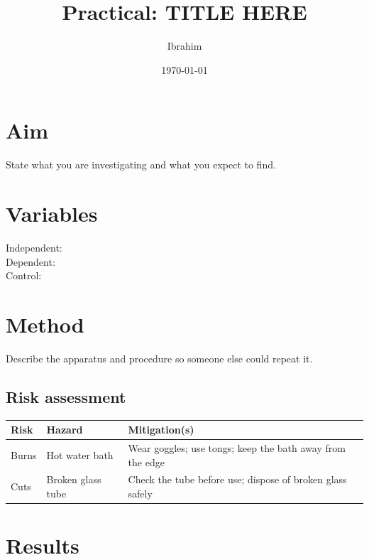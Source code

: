 \documentclass[11pt,a4paper]{article}
\title{Practical: TITLE HERE}
\author{Ibrahim}
\date{\today}
\begin{document}
\maketitle

\section{Aim}
State what you are investigating and what you expect to find.

\section{Variables}
\begin{description}
  \item[Independent:] 
  \item[Dependent:] 
  \item[Control:] 
\end{description}

\section{Method}
Describe the apparatus and procedure so someone else could repeat it.

\subsection{Risk assessment}
\begin{table}[H]\centering
\begin{tabularx}{\textwidth}{@{}l X X@{}}
\toprule
Risk & Hazard & Mitigation(s) \\
\midrule
Burns & Hot water bath & Wear goggles; use tongs; keep the bath away from the edge \\
Cuts & Broken glass tube & Check the tube before use; dispose of broken glass safely \\
\bottomrule
\end{tabularx}
\end{table}

\section{Results}
\begin{table}[H]\centering
{}
\caption{Results table.}
\end{table}
\end{document}

